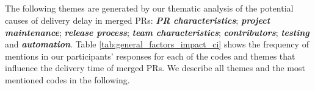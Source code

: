 \subsection*{\textbf{\RQfour}}

The following themes are generated by our thematic analysis of the potential causes of delivery delay in merged PRs: \textit{\textbf{PR characteristics}}; \textit{\textbf{project maintenance}}; \textit{\textbf{release process}}; \textit{\textbf{team characteristics}}; \textit{\textbf{contributors}}; \textit{\textbf{testing}} and \textit{\textbf{automation}}. Table \ref{tab:general_factors_impact_ci} shows the frequency of mentions in our participants' responses for each of the codes and themes that influence the delivery time of merged PRs. We describe all themes and the most mentioned codes in the following.

